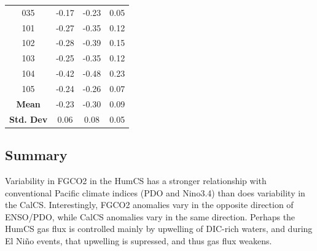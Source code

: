 \documentclass[12pt]{article}
\begin{document}
\begin{table}[p!]
\begin{tabular}{c | c c c}
		035 &  -0.17 &    -0.23 &       0.05 \\
		101 &  -0.27 &    -0.35 &       0.12 \\
		102 &  -0.28 &    -0.39 &       0.15 \\
		103 &  -0.25 &    -0.35 &       0.12 \\
		104 &  -0.42 &    -0.48 &       0.23 \\
		105 &  -0.24 &    -0.26 &       0.07 \\
		\bottomrule
		\textbf{Mean} & -0.23 & -0.30 & 0.09 \\
		\textbf{Std. Dev} & 0.06 & 0.08 & 0.05 \\
	\end{tabular}
	\label{tab:4}
\end{table}

\clearpage
\subsection{Summary}
Variability in FGCO2 in the HumCS has a stronger relationship with conventional Pacific climate indices (PDO and Nino3.4) than does variability in the CalCS. Interestingly, FGCO2 anomalies vary in the opposite direction of ENSO/PDO, while CalCS anomalies vary in the same direction. Perhaps the HumCS gas flux is controlled mainly by upwelling of DIC-rich waters, and during El Ni\~no events, that upwelling is supressed, and thus gas flux weakens. 

\clearpage

\end{document}
